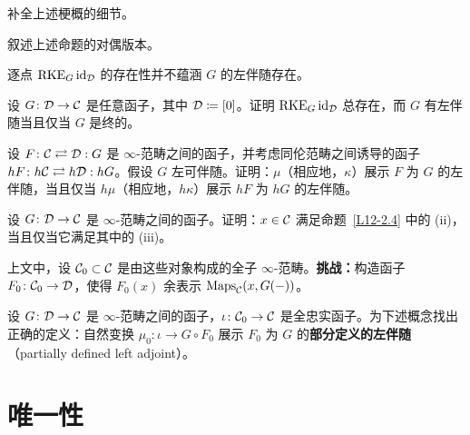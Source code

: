 \begin{exercise}\label{L12-2.5}
补全上述梗概的细节。
\end{exercise}

\begin{exercise}\label{L12-2.6}
叙述上述命题的对偶版本。
\end{exercise}

\begin{warning}\label{L12-2.7}
逐点 $\mathrm{RKE}_{G}\operatorname{id}_{\mathcal{D}}$ 的存在性并不蕴涵 $G$ 的左伴随存在。
\end{warning}

\begin{exercise}\label{L12-2.8}
设 $G\colon\mathcal{D}\to\mathcal{C}$ 是任意函子，其中 $\mathcal{D}\coloneqq[0]$。证明 $\mathrm{RKE}_{G}\operatorname{id}_{\mathcal{D}}$ 总存在，而 $G$ 有左伴随当且仅当 $G$ 是终的。
\end{exercise}

\begin{exercise}\label{L12-2.9}
设 $F\colon\mathcal{C}\rightleftarrows\mathcal{D}:G$ 是 $\infty$-范畴之间的函子，并考虑同伦范畴之间诱导的函子 $hF\colon h\mathcal{C}\rightleftarrows h\mathcal{D}:hG$。假设 $G$ 左可伴随。证明：$\mu$（相应地，$\kappa$）展示 $F$ 为 $G$ 的左伴随，当且仅当 $h\mu$（相应地，$h\kappa$）展示 $hF$ 为 $hG$ 的左伴随。
\end{exercise}

\begin{exercise}\label{L12-2.10}
设 $G\colon\mathcal{D}\to\mathcal{C}$ 是 $\infty$-范畴之间的函子。证明：$x\in\mathcal{C}$ 满足命题~\ref{L12-2.4} 中的 (ii)，当且仅当它满足其中的 (iii)。
\end{exercise}

\begin{exercise}\label{L12-2.11}
上文中，设 $\mathcal{C}_0\subset\mathcal{C}$ 是由这些对象构成的全子 $\infty$-范畴。\textbf{挑战：}构造函子 $F_0\colon\mathcal{C}_0\to\mathcal{D}$，使得 $F_0(x)$ 余表示 $\operatorname{Maps}_{\mathcal{C}}(x,G(-))$。
\end{exercise}

\begin{exercise}\label{L12-2.12}
设 $G\colon\mathcal{D}\to\mathcal{C}$ 是 $\infty$-范畴之间的函子，$\iota\colon\mathcal{C}_0\to\mathcal{C}$ 是全忠实函子。为下述概念找出正确的定义：自然变换 $\mu_0\colon\iota\to G\circ F_0$ 展示 $F_0$ 为 $G$ 的\textbf{部分定义的左伴随}（partially defined left adjoint）。
\end{exercise}

\section{唯一性}

